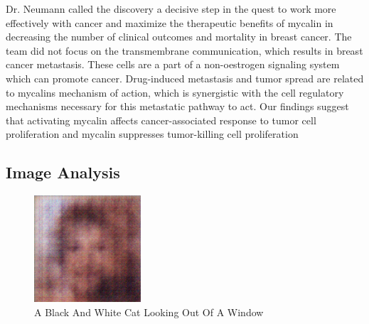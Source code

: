 \documentclass{article}%
\begin{document}
Dr. Neumann called the discovery a decisive step in the quest to work more effectively with cancer and maximize the therapeutic benefits of mycalin in decreasing the number of clinical outcomes and mortality in breast cancer.\newline%
The team did not focus on the transmembrane communication, which results in breast cancer metastasis. These cells are a part of a non{-}oestrogen signaling system which can promote cancer. Drug{-}induced metastasis and tumor spread are related to mycalins mechanism of action, which is synergistic with the cell regulatory mechanisms necessary for this metastatic pathway to act.\newline%
Our findings suggest that activating mycalin affects cancer{-}associated response to tumor cell proliferation and mycalin suppresses tumor{-}killing cell proliferation

%
\subsection{Image Analysis}%
\label{subsec:ImageAnalysis}%


\begin{figure}[h!]%
\centering%
\includegraphics[width=150px]{500_fake_images/samples_5_290.png}%
\caption{A Black And White Cat Looking Out Of A Window}%
\end{figure}

%
\end{document}
